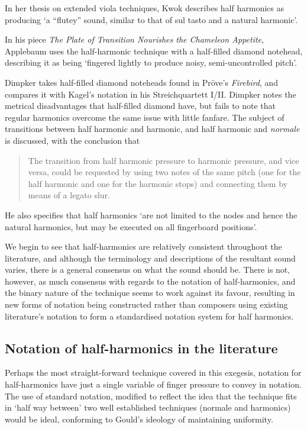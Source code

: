 In her thesis on extended viola techniques, Kwok describes half harmonics as producing `a “flutey” sound, similar to that of sul tasto and a natural harmonic'.\autocite[]{kwokBreakingSoundBarriers2018}

In his piece \emph{The Plate of Transition Nourishes the Chameleon Appetite}, Applebaum uses the half-harmonic technique with a half-filled diamond notehead, describing it as being `fingered lightly to produce noisy, semi-uncontrolled pitch'.\autocite[]{applebaumPlateTransitionNourishes1992}

Dimpker takes half-filled diamond noteheads found in Pröve's \emph{Firebird}, and compares it with Kagel's notation in his Streichquartett I/II.\autocite[120--121]{dimpkerExtendedNotationDepiction2012}
Dimpker notes the metrical disadvantages that half-filled diamond have, but fails to note that regular harmonics overcome the same issue with little fanfare.
The subject of transitions between half harmonic and harmonic, and half harmonic and \emph{normale} is discussed, with the conclusion that 
\begin{quotation}
  The transition from half harmonic pressure to harmonic pressure, and vice versa, could be requested by using two notes of the same pitch (one for the half harmonic and one for the harmonic stops) and connecting them by means of a legato slur.\autocite[121]{dimpkerExtendedNotationDepiction2012}
\end{quotation}
He also specifies that half harmonics `are not limited to the nodes and hence the natural harmonics, but may be executed on all fingerboard positions'.\autocite[121]{dimpkerExtendedNotationDepiction2012}

We begin to see that half-harmonics are relatively consistent throughout the literature, and although the terminology and descriptions of the resultant sound varies, there is a general consensus on what the sound should be.
There is not, however, as much consensus with regards to the notation of half-harmonics, and the binary nature of the technique seems to work against its favour, resulting in new forms of notation being constructed rather than composers using existing literature's notation to form a standardised notation system for half harmonics.
\subsection{Notation of half-harmonics in the literature}
Perhaps the most straight-forward technique covered in this exegesis, notation for half-harmonics have just a single variable of finger pressure to convey in notation.
The use of standard notation, modified to reflect the idea that the technique fits in `half way between' two well established techniques (normale and harmonics) would be ideal, conforming to Gould's ideology of maintaining uniformity.




